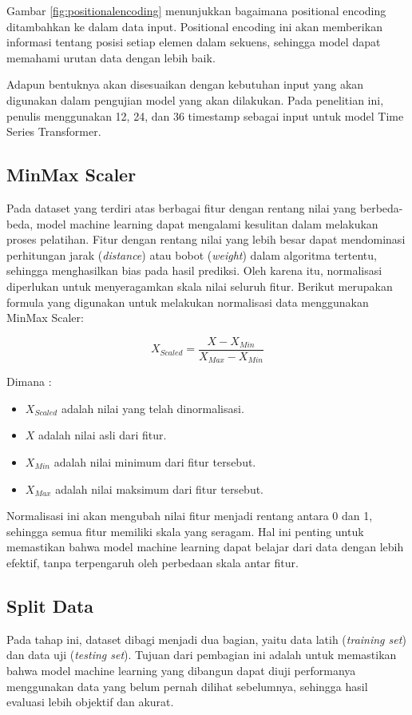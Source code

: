 Gambar \ref{fig:positionalencoding} menunjukkan bagaimana positional encoding ditambahkan ke dalam data input. Positional encoding ini akan memberikan informasi tentang posisi setiap elemen dalam sekuens, sehingga model dapat memahami urutan data dengan lebih baik.

Adapun bentuknya akan disesuaikan dengan kebutuhan input yang akan digunakan dalam pengujian model yang akan dilakukan. Pada penelitian ini, penulis menggunakan 12, 24, dan 36 timestamp sebagai input untuk model Time Series Transformer.

\subsection{MinMax Scaler}
Pada dataset yang terdiri atas berbagai fitur dengan rentang nilai yang berbeda-beda, model machine learning dapat mengalami kesulitan dalam melakukan proses pelatihan. Fitur dengan rentang nilai yang lebih besar dapat mendominasi perhitungan jarak (\textit{distance}) atau bobot (\textit{weight}) dalam algoritma tertentu, sehingga menghasilkan bias pada hasil prediksi. Oleh karena itu, normalisasi diperlukan untuk menyeragamkan skala nilai seluruh fitur. Berikut merupakan formula yang digunakan untuk melakukan normalisasi data menggunakan MinMax Scaler:

\begin{equation}
  X_{Scaled} = \frac{X - X_{Min}}{X_{Max}-X_{Min}}
\end{equation}

Dimana : 
\begin{itemize}
    \item \( X_{Scaled} \) adalah nilai yang telah dinormalisasi.
    \item \( X \) adalah nilai asli dari fitur.
    \item \( X_{Min} \) adalah nilai minimum dari fitur tersebut.
    \item \( X_{Max} \) adalah nilai maksimum dari fitur tersebut.
\end{itemize}
Normalisasi ini akan mengubah nilai fitur menjadi rentang antara 0 dan 1, sehingga semua fitur memiliki skala yang seragam. Hal ini penting untuk memastikan bahwa model machine learning dapat belajar dari data dengan lebih efektif, tanpa terpengaruh oleh perbedaan skala antar fitur.

\subsection{Split Data}
Pada tahap ini, dataset dibagi menjadi dua bagian, yaitu data latih (\textit{training set}) dan data uji (\textit{testing set}). Tujuan dari pembagian ini adalah untuk memastikan bahwa model machine learning yang dibangun dapat diuji performanya menggunakan data yang belum pernah dilihat sebelumnya, sehingga hasil evaluasi lebih objektif dan akurat.

